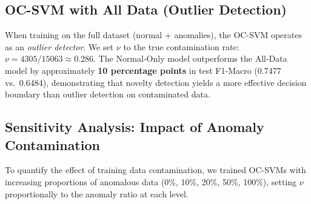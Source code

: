 \subsection{OC-SVM with All Data (Outlier Detection)} \label{sec:ocsvm_all}

    When training on the full dataset (normal + anomalies), the OC-SVM operates as an \emph{outlier detector}.
    We set $\nu$ to the true contamination rate: $\nu = 4305/15063 \approx 0.286$.
    The Normal-Only model outperforms the All-Data model by approximately \textbf{10 percentage points} in test F1-Macro (0.7477 vs.\ 0.6484), demonstrating that novelty detection yields a more effective decision boundary than outlier detection on contaminated data.

\subsection{Sensitivity Analysis: Impact of Anomaly Contamination} \label{sec:sensitivity}

    To quantify the effect of training data contamination, we trained OC-SVMs with increasing proportions of anomalous data (0\%, 10\%, 20\%, 50\%, 100\%), setting $\nu$ proportionally to the anomaly ratio at each level.

